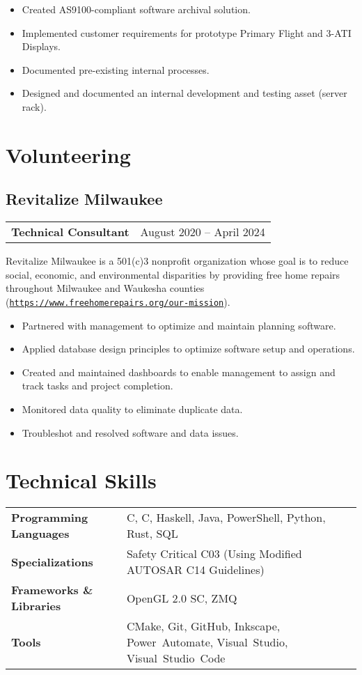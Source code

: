 \documentclass[10pt]{article}
\newcommand{\Rplus}{\protect\raisebox{0.35ex}{\smaller[2]{\textbf{+}}}}
\newcommand{\Rsharp}{\protect\raisebox{0.35ex}{\smaller[2]{\textbf{\#}}}}
\newcommand{\Cpp}{\mbox{C\Rplus\Rplus}}
\newcommand{\Csharp}{\mbox{C\Rsharp}}
\newcommand{\firstpar}{\vspace{4pt}\noindent}
\begin{document}
\begin{itemize}[noitemsep, leftmargin=*]
  \item Created AS9100-compliant software archival solution.
  \item Implemented customer requirements for prototype Primary Flight and 3-ATI Displays.
  \item Documented pre-existing internal processes.
  \item Designed and documented an internal development and testing asset (server rack).
\end{itemize}

\section*{Volunteering}
\subsection*{Revitalize Milwaukee}
\begin{tabular}{@{}ll@{}}
  \textbf{Technical Consultant} & August 2020 -- April 2024
\end{tabular}

\firstpar
Revitalize Milwaukee is a 501(c)3 nonprofit organization whose goal is to reduce social, economic,
and environmental disparities by providing free home repairs throughout Milwaukee and Waukesha counties
(\href{https://www.freehomerepairs.org/our-mission}{\texttt{https://www.freehomerepairs.org/our-mission}}).

\begin{itemize}[noitemsep, leftmargin=*]
  \item Partnered with management to optimize and maintain planning software.
  \item Applied database design principles to optimize software setup and operations.
  \item Created and maintained dashboards to enable management to assign and track tasks and project completion.
  \item Monitored data quality to eliminate duplicate data.
  \item Troubleshot and resolved software and data issues.
\end{itemize}

\section*{Technical Skills}
\begin{tabularx}{\textwidth}{@{}>{\bfseries}l>{\raggedright\arraybackslash}X@{}}
  Programming Languages &
  \Cpp, \Csharp, Haskell, Java, PowerShell, Python, Rust, SQL \\
  Specializations &
  Safety Critical \Cpp{03} (Using Modified AUTOSAR \Cpp{14} Guidelines) \\
  Frameworks \& Libraries &
  OpenGL 2.0 SC, ZMQ \\
  Tools &
  CMake, Git, GitHub, Inkscape, \mbox{Power Automate}, \mbox{Visual Studio}, \mbox{Visual Studio Code}
\end{tabularx}
\end{document}
